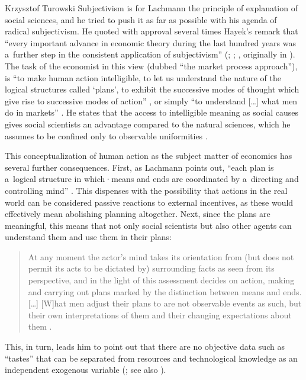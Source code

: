 \begin{artengenv}{Krzysztof Turowski}
Subjectivism is for Lachmann the principle of explanation of social sciences, and he tried to push it as far as possible with his agenda of radical subjectivism.
He quoted with approval several times Hayek's remark that ``every important advance in economic theory during the last hundred years was a~further step in the consistent application of subjectivism'' (\cite[155]{lachmann-individualism}; \citeyear[23]{lachmann1986market}; \citeyear[3]{lachmann-shackle-place}, originally in \cite[31]{hayek-counterrevolution}).
The task of the economist in this view (dubbed ``the market process approach''), is ``to make human action intelligible, to let us understand the nature of the logical structures called `plans', to exhibit the successive modes of thought which give rise to successive modes of action'' \parencite[417]{lachmann-ha}, or simply ``to understand [\ldots] what men do in markets'' \parencite[3]{lachmann1986market}.
He states that the access to intelligible meaning as social causes gives social scientists an advantage compared to the natural sciences, which he assumes to be confined only to observable uniformities \parencite[90]{lachmann-shackle-time}.

This conceptualization of human action as the subject matter of economics has several further consequences. First, as Lachmann points out, ``each plan is a~logical structure in which·means and ends are coordinated by a~directing and controlling mind'' \parencite[418]{lachmann-ha}.
This dispenses with the possibility that actions in the real world can be considered passive reactions to external incentives, as these would effectively mean abolishing planning altogether.
Next, since the plans are meaningful, this means that not only social scientists but also other agents can understand them and use them in their plans:
\begin{quote}
At any moment the actor's mind takes its orientation from (but does not permit its acts to be dictated by) surrounding facts as seen from its perspective, and in the light of this assessment decides on action, making and carrying out plans marked by the distinction between means and ends. [\ldots] [W]hat men adjust their plans to are not observable events as such, but their own interpretations of them and their changing expectations about them \parencite[4]{lachmann1986market}.
\end{quote}
This, in turn, leads him to point out that there are no objective data such as ``tastes'' that can be separated from resources and technological knowledge as an independent exogenous variable (\cite[24]{lachmann1986market}; see also \cite[35]{lachmann-crisis}).


\end{artengenv}
